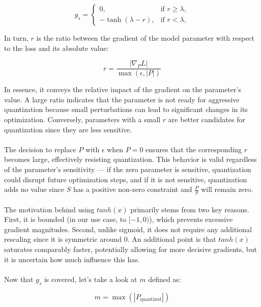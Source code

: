 \[
g_s = 
\begin{cases} 
0, & \text{if } r \geq \lambda, \\
- \tanh(\lambda - r), & \text{if } r < \lambda,
\end{cases}
\]

\noindent In turn, \(  r  \) is the ratio between the gradient of the model parameter with respect to the loss and its absolute value:

\[
r = \frac{\left| \nabla_P L \right|}{\max(\epsilon, \left| P \right|)}
\]

\noindent In essence, it conveys the relative impact of the gradient on the parameter's value.
A large ratio indicates that the parameter is not ready for aggressive quantization
because small perturbations can lead to significant changes in its optimization.
Conversely, parameters with a small \(  r  \) are better candidates
for quantization since they are less sensitive.
\\
\\
The decision to replace \( P \) with \( \epsilon \) when \( P = 0 \)
ensures that the corresponding \( r \) becomes large,
effectively resisting quantization. This behavior is valid regardless of the parameter's sensitivity
 — if the zero parameter is sensitive, quantization could disrupt future optimization steps,
 and if it is not sensitive, quantization adds no value since \( S \) has a positive non-zero constraint 
 and \( \frac{P}{S} \) will remain zero.
\\
\\
The motivation behind using \( tanh(x) \) primarily stems from two key reasons. 
First, it is bounded (in our use case, to \( [-1, 0) \)), which prevents excessive gradient magnitudes.
Second, unlike sigmoid, it does not require any additional rescaling since it is
symmetric around \( 0 \). An additional point is that \( tanh(x) \) saturates comparably faster,
potentially allowing for more decisive gradients,
but it is uncertain how much influence this has.
\\
\\
Now that \( g_s \) is covered, let's take a look at \( m \) defined as:

\[
m = \max\left(\left| P_{\text{quantized}} \right|\right) 
\]

